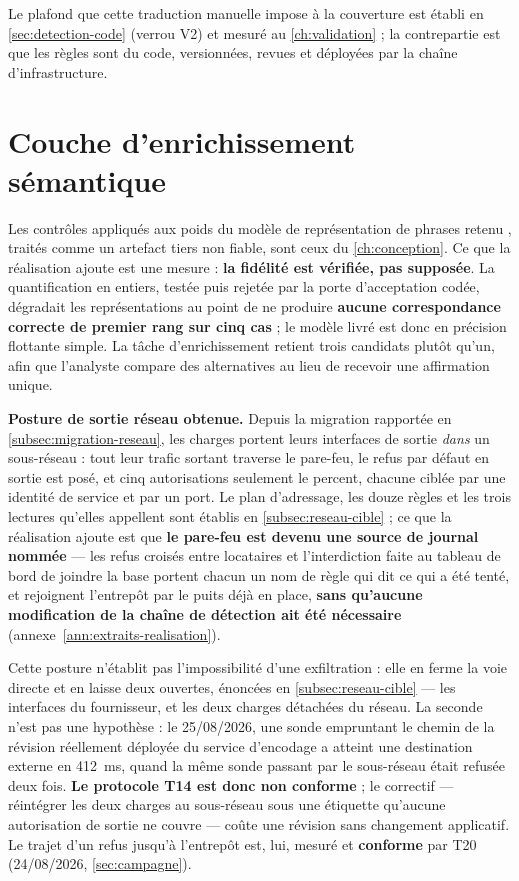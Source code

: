 Le plafond que cette traduction manuelle impose à la couverture est établi en
\cref{sec:detection-code} (verrou V2) et mesuré au \cref{ch:validation} ; la contrepartie est que les règles
sont du code, versionnées, revues et déployées par la chaîne d'infrastructure.

\section{Couche d'enrichissement sémantique}

Les contrôles appliqués aux poids du modèle de représentation de phrases retenu
\cite{securebert2022,smet2023}, traités comme un artefact tiers non fiable, sont ceux du
\cref{ch:conception}. Ce que la réalisation ajoute est une mesure : \textbf{la fidélité est vérifiée, pas
supposée}. La quantification en entiers, testée puis rejetée par la porte d'acceptation codée,
dégradait les représentations au point de ne produire \textbf{aucune correspondance correcte de
premier rang sur cinq cas} ; le modèle livré est donc en précision flottante simple. La tâche
d'enrichissement retient trois candidats plutôt qu'un, afin que l'analyste compare des alternatives
au lieu de recevoir une affirmation unique.

\textbf{Posture de sortie réseau obtenue.} Depuis la migration rapportée en
\cref{subsec:migration-reseau}, les charges portent leurs interfaces de sortie \emph{dans} un
sous-réseau : tout leur trafic sortant traverse le pare-feu, le refus par défaut en sortie est posé,
et cinq autorisations seulement le percent, chacune ciblée par une identité de service et par un
port. Le plan d'adressage, les douze règles et les trois lectures qu'elles appellent sont établis en
\cref{subsec:reseau-cible} ; ce que la réalisation ajoute est que \textbf{le pare-feu est devenu une
source de journal nommée} --- les refus croisés entre locataires et l'interdiction faite au tableau
de bord de joindre la base portent chacun un nom de règle qui dit ce qui a été tenté, et rejoignent
l'entrepôt par le puits déjà en place, \textbf{sans qu'aucune modification de la chaîne de détection
ait été nécessaire} (annexe~\ref{ann:extraits-realisation}).

Cette posture n'établit pas l'impossibilité d'une exfiltration : elle en ferme la voie directe et en
laisse deux ouvertes, énoncées en \cref{subsec:reseau-cible} --- les interfaces du fournisseur, et
les deux charges détachées du réseau. La seconde n'est pas une hypothèse : le 25/08/2026, une sonde
empruntant le chemin de la révision réellement déployée du service d'encodage a atteint une
destination externe en 412~ms, quand la même sonde passant par le sous-réseau était refusée deux
fois. \textbf{Le protocole T14 est donc non conforme} ; le correctif --- réintégrer les deux charges
au sous-réseau sous une étiquette qu'aucune autorisation de sortie ne couvre --- coûte une révision
sans changement applicatif. Le trajet d'un refus jusqu'à l'entrepôt est, lui, mesuré et
\textbf{conforme} par T20 (24/08/2026, \cref{sec:campagne}).

